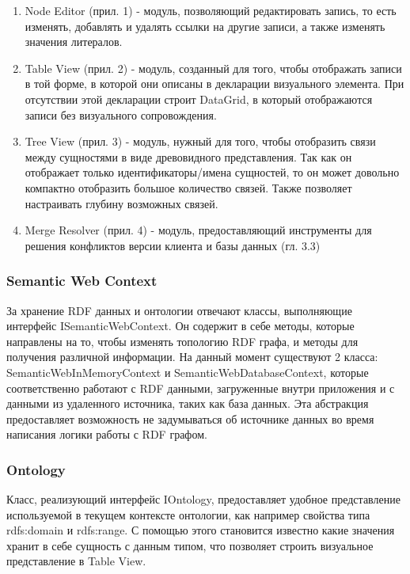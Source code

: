 \documentclass[12pt]{article}
\begin{document}
\begin{enumerate}
    \item Node Editor (прил. 1) - модуль, позволяющий редактировать запись, то есть изменять, добавлять и удалять ссылки на другие записи, а также изменять значения литералов.
    \item Table View (прил. 2) - модуль, созданный для того, чтобы отображать записи в той форме, в которой они описаны в декларации визуального элемента. При отсутствии этой декларации строит DataGrid, в который отображаются записи без визуального сопровождения.
    \item Tree View (прил. 3) - модуль, нужный для того, чтобы отобразить связи между сущностями в виде древовидного представления. Так как он отображает только идентификаторы/имена сущностей, то он может довольно компактно отобразить большое количество связей. Также позволяет настраивать глубину возможных связей.
    \item Merge Resolver (прил. 4) - модуль, предоставляющий инструменты для решения конфликтов версии клиента и базы данных (гл. 3.3)
\end{enumerate}

\subsubsection{Semantic Web Context}
\qquad За хранение RDF данных и онтологии отвечают классы, выполняющие интерфейс ISemanticWebContext. Он содержит в себе методы, которые направлены на то, чтобы изменять топологию RDF графа, и методы для получения различной информации. На данный момент существуют 2 класса: SemanticWebInMemoryContext и SemanticWebDatabaseContext, которые соответственно работают с RDF данными, загруженные внутри приложения и с данными из удаленного источника, таких как база данных. Эта абстракция предоставляет возможность не задумываться об источнике данных во время написания логики работы с RDF графом.

\subsubsection{Ontology}
\qquad Класс, реализующий интерфейс IOntology, предоставляет удобное представление используемой в текущем контексте онтологии, как например свойства типа rdfs:domain и rdfs:range. С помощью этого становится известно какие значения хранит в себе сущность с данным типом, что позволяет строить визуальное представление в Table View.
\end{document}

